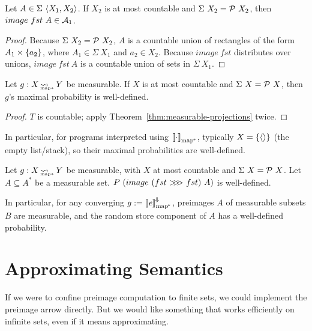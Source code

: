 \documentclass[preprint]{sigplanconf}
\newcommand{\arrow}{\rightsquigarrow}
\newcommand{\conv}{^{\mspace{-2mu}\Downarrow\mspace{-2mu}}}
\newcommand{\meaningofconv}[1]{\left\llbracket{#1}\right\rrbracket\conv}
\newcommand{\arrowcomp}{\ensuremath{{>}\mspace{-6mu}{>}\mspace{-6mu}{>}}}
\newcommand{\pmap}{_\mathrm{map^{\mspace{-2mu}*}}}
\DeclareMathOperator{\pmapto}{\arrow_{\mspace{-22mu}_{\mathrm{map*}}}}
\begin{document}
\begin{theorem}
Let $A \in \Sigma~\langle{X_1,X_2}\rangle$.
If $X_2$ is at most countable and $\Sigma~X_2 = \mathcal{P}~X_2$, then $image~fst~A \in \mathcal{A}_1$.
\label{thm:measurable-projections}
\end{theorem}
\begin{proof}
Because $\Sigma~X_2 = \mathcal{P}~X_2$, $A$ is a countable union of rectangles of the form $A_1 \times \{{a_2}\}$, where $A_1 \in \Sigma~X_1$ and $a_2 \in X_2$.
Because $image~fst$ distributes over unions, $image~fst~A$ is a countable union of sets in $\Sigma~X_1$.
\end{proof}

\begin{theorem}
Let $g : X \pmapto Y$ be measurable.
If $X$ is at most countable and $\Sigma~X = \mathcal{P}~X$, then $g$'s maximal probability is well-defined.
\end{theorem}
\begin{proof}
$T$ is countable; apply Theorem~\ref{thm:measurable-projections} twice.
\end{proof}

In particular, for programs interpreted using $\meaningof{\cdot}\pmap$, typically $X = \{{\langle{}\rangle}\}$ (the empty list/stack), so their maximal probabilities are well-defined.

\begin{corollary}
Let $g : X \pmapto Y$ be measurable, with $X$ at most countable and $\Sigma~X = \mathcal{P}~X$. Let $A \subseteq A^*$ be a measurable set.
$P~(image~(fst~\arrowcomp~fst)~A)$ is well-defined.
\end{corollary}

In particular, for any converging $g := \meaningofconv{\mathit{e}}\pmap$, preimages $A$ of measurable subsets $B$ are measurable, and the random store component of $A$ has a well-defined probability.


\section{Approximating Semantics}

If we were to confine preimage computation to finite sets, we could implement the preimage arrow directly.
But we would like something that works efficiently on infinite sets, even if it means approximating.
\end{document}
